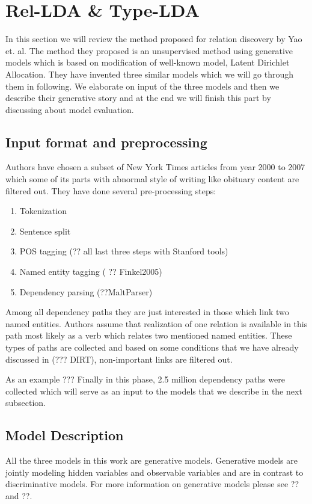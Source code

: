 \documentclass[12pt]{report}
\begin{document}
\section{Rel-LDA \& Type-LDA}
\label{ch:unsupervised}

In this section we will review the method proposed for relation discovery  by Yao et. al. 
The method they  proposed is an unsupervised method using generative models which is based on 
modification of well-known model, Latent Dirichlet Allocation. 
They have invented three similar models which we will go through them in following. 
We elaborate on input of the three models and then we describe their generative story 
and at the end we will finish this part by discussing about  model evaluation.

\subsection{Input format and preprocessing}
\label{ch:input}
Authors have chosen a subset of New York Times articles from year 2000 to 2007 which some of its parts with
abnormal style of writing like obituary content are filtered out.
They have done several pre-processing steps:
\begin{enumerate}
\item Tokenization
\item Sentence split
\item POS tagging (?? all last three steps with Stanford tools)
\item Named entity tagging ( ?? Finkel2005)
\item Dependency parsing (??MaltParser)
\end{enumerate}
Among all dependency paths they are just interested in those which link two named entities.
 Authors assume that realization of one relation is available in this 
 path most likely as a verb which relates two mentioned named entities. These types of 
 paths are collected and based on some conditions that we have already discussed in (??? DIRT), non-important links are filtered out.
 
 As an example ???
 Finally in this phase, 2.5 million dependency paths were collected 
 which will serve as an input to the models that we describe in the next subsection.


\subsection {Model Description}
\label{ch:model}
All the three models in this work are generative models. Generative models are jointly modeling hidden variables and observable variables and 
are in contrast to discriminative models. For more information on generative models please see ?? and ??.\\
\end{document}

